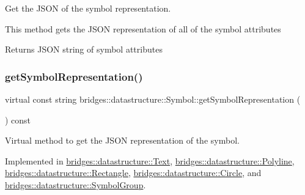 Get the J\+S\+ON of the symbol representation. 

This method gets the J\+S\+ON representation of all of the symbol attributes

\begin{DoxyReturn}{Returns}
J\+S\+ON string of symbol attributes 
\end{DoxyReturn}
\mbox{\label{classbridges_1_1datastructure_1_1_symbol_a8044b3da559dcd9de8510ae339f126c8}} 
\subsubsection{\texorpdfstring{get\+Symbol\+Representation()}{getSymbolRepresentation()}}
{\footnotesize\ttfamily virtual const string bridges\+::datastructure\+::\+Symbol\+::get\+Symbol\+Representation (\begin{DoxyParamCaption}{ }\end{DoxyParamCaption}) const\hspace{0.3cm}{\ttfamily [pure virtual]}}



Virtual method to get the J\+S\+ON representation of the symbol. 



Implemented in \hyperlink{classbridges_1_1datastructure_1_1_text_ab326f0cf60addd3027a02fd1f90b6961}{bridges\+::datastructure\+::\+Text}, \hyperlink{classbridges_1_1datastructure_1_1_polyline_ab78c7200a23cdd652fd5a9722ac4526d}{bridges\+::datastructure\+::\+Polyline}, \hyperlink{classbridges_1_1datastructure_1_1_rectangle_a13fa4e45a78fdc7c49bfe566cb809ab3}{bridges\+::datastructure\+::\+Rectangle}, \hyperlink{classbridges_1_1datastructure_1_1_circle_a5b896b2aba1fd468f9ddb3aa3b719fe9}{bridges\+::datastructure\+::\+Circle}, and \hyperlink{classbridges_1_1datastructure_1_1_symbol_group_af3a4109c7a19314a611e879cb2b0aeca}{bridges\+::datastructure\+::\+Symbol\+Group}.

\mbox{\label{classbridges_1_1datastructure_1_1_symbol_a9a67f28b905c36cab31ca4e7b59927ee}} 
